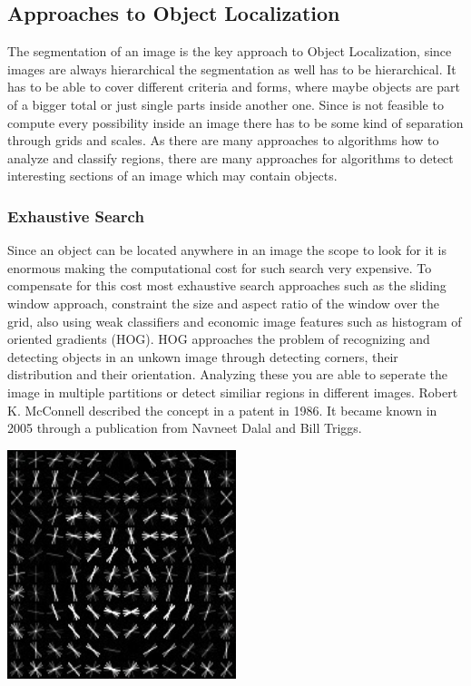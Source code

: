 \subsection{Approaches to Object Localization}
The segmentation of an image is the key approach to Object Localization, since images are always hierarchical the segmentation as well has
to be hierarchical. It has to be able to cover different criteria and forms, where maybe objects are part of a bigger total or just single
parts inside another one. Since is not feasible to compute every possibility inside an image there has to be some kind of separation
through grids and scales.
\newline
As there are many approaches to algorithms how to analyze and classify regions, there are many approaches for algorithms to detect
interesting sections of an image which may contain objects.

\subsubsection{Exhaustive Search}
Since an object can be located anywhere in an image the scope to look for it is enormous making the computational cost for such search very
expensive. To compensate for this cost most exhaustive search approaches such as the sliding window approach, constraint the size and aspect
ratio of the window over the grid, also using weak classifiers and economic image features such as histogram of oriented gradients
(HOG).\cite{selectivesearch}
\newline
HOG approaches the problem of recognizing and detecting objects in an unkown image through detecting corners, their distribution and their
orientation. Analyzing these you are able to seperate the image in multiple partitions or detect similiar regions in different images.
Robert K. McConnell described the concept in a patent in 1986. It became known in 2005 through a publication from Navneet Dalal and Bill
Triggs.\cite{wiki_hog}
\newline
\begin{center}
    \includegraphics[width=0.5\textwidth]{images/Dlib_Learned-HOG-Detector.jpg} \cite{wiki_hog}
\end{center}

